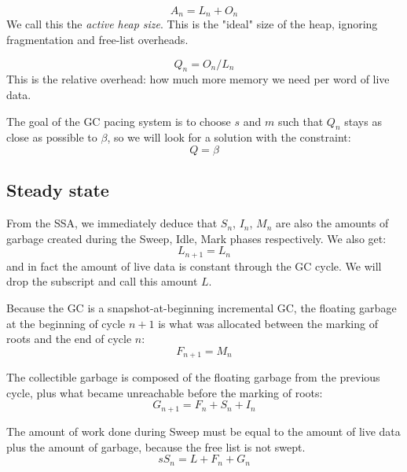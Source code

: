 \documentclass{article}
\begin{document}
\begin{equation}\label{def-A}
A_n = L_n + O_n
\end{equation}
We call this the \emph{active heap size}. This is the "ideal" size of
the heap, ignoring fragmentation and free-list overheads.

\begin{equation}\label{def-Q}
Q_n = O_n/L_n
\end{equation}
This is the relative overhead: how much more memory we need per word
of live data.

The goal of the GC pacing system is to choose $s$ and $m$ such that
$Q_n$ stays as close as possible to $\beta$, so we will look for a
solution with the constraint:
\begin{equation}\label{beta-Q}
Q = \beta
\end{equation}

\subsection{Steady state}

From the SSA, we immediately deduce that $S_n$, $I_n$, $M_n$ are also
the amounts of garbage created during the Sweep, Idle, Mark phases
respectively. We also get:
\begin{equation}
  L_{n+1} = L_n
\end{equation}
and in fact the amount of live data is constant through the GC
cycle. We will drop the subscript and call this amount $L$.

Because the GC is a snapshot-at-beginning incremental GC, the floating
garbage at the beginning of cycle $n+1$ is what was allocated between
the marking of roots and the end of cycle $n$:
\begin{equation}\label{eqn-F}
  F_{n+1} = M_n
\end{equation}

The collectible garbage is composed of the floating garbage from the
previous cycle, plus what became unreachable before the marking of
roots:
\begin{equation}\label{eqn-G}
  G_{n+1} = F_n + S_n + I_n
\end{equation}

The amount of work done during Sweep must be equal to the amount of
live data plus the amount of garbage, because the free list is not
swept.
\begin{equation}\label{eqn-sS}
sS_n = L + F_n + G_n
\end{equation}
\end{document}
